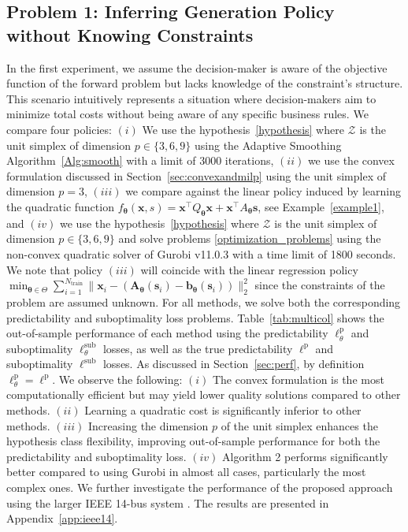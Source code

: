 \documentclass{article}
\theoremstyle{plain}
\begin{document}
\subsection{Problem 1: Inferring Generation Policy without Knowing Constraints}\label{sec:power_app1}
In the first experiment, we assume the decision-maker is aware of  the objective function of the forward problem but lacks knowledge of the constraint's structure. This scenario intuitively represents a situation where decision-makers aim to minimize total costs without being aware of any specific business rules. We compare four policies: $(i)$ We use the hypothesis~\eqref{hypothesis} where $\mathcal{Z}$ is the unit simplex of dimension $p\in\{3,6,9\}$ using the Adaptive Smoothing Algorithm~\ref{Alg:smooth} with a limit of 3000 iterations, $(ii)$ we use the convex formulation discussed in Section~\ref{sec:convexandmilp} using the unit simplex of dimension $p = 3$, $(iii)$ we compare against the linear policy induced by learning the quadratic function $f_{\bm{\theta}}(\bm{x}, s) = \bm{x}^\top Q_{\bm{\theta}} \bm{x} + \bm{x}^\top A_{\bm{\theta}} \bm s $, see Example~\ref{example1}, and $(iv)$ we use the hypothesis~\eqref{hypothesis} where $\mathcal{Z}$ is the unit simplex of dimension $p\in\{3,6,9\}$ and solve problems \eqref{optimization_problems} using the non-convex quadratic solver of Gurobi v11.0.3 with a time limit of 1800 seconds. We note that  policy $(iii)$ will coincide with the linear regression policy $\min_{\bm\theta\in\Theta}\sum_{i = 1}^{N_\text{train}} \|\bm x_i - (\bm A_{\bm \theta}(\bm s_i) - \bm b_{\bm\theta}(\bm s_i))\|^2_2$ since the constraints of the problem are assumed unknown. For all methods, we solve both the corresponding predictability and suboptimality loss problems. 
Table~\ref{tab:multicol} shows the out-of-sample performance of each method using the predictability $\ell_\theta^\text{p}$ and suboptimality $\ell_\theta^\text{sub}$ losses, as well as the true predictability $\ell^\text{p}$ and suboptimality $\ell^\text{sub}$ losses. As discussed in Section~\ref{sec:perf}, by definition $\ell_\theta^\text{p} = \ell^\text{p}$. We observe the following: $(i)$ The convex formulation is the most computationally efficient but may yield lower quality solutions compared to other methods. $(ii)$ Learning a quadratic cost is significantly inferior to other methods. $(iii)$ Increasing the dimension $p$ of the unit simplex enhances the hypothesis class flexibility, improving out-of-sample performance for both the predictability and suboptimality loss. $(iv)$ Algorithm 2 performs significantly better compared to using Gurobi in almost all cases, particularly the most complex ones.
We further investigate the performance of the proposed approach using the larger IEEE 14-bus system \cite{leon2020quadratically}. The results are presented in Appendix~\ref{app:ieee14}.
 
\end{document}
